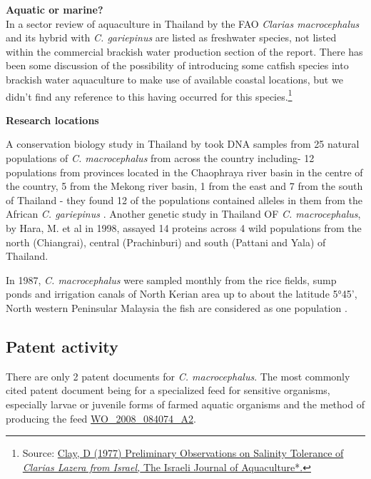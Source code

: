 \documentclass[]{book}
\theoremstyle{definition}
\theoremstyle{definition}
\theoremstyle{definition}
\theoremstyle{remark}
\begin{document}
\textbf{Aquatic or marine?}\\
In a sector review of aquaculture in Thailand by the FAO \emph{Clarias
macrocephalus} and its hybrid with \emph{C. gariepinus} are listed as
freshwater species, not listed within the commercial brackish water
production section of the report. There has been some discussion of the
possibility of introducing some catfish species into brackish water
aquaculture to make use of available coastal locations, but we didn't
find any reference to this having occurred for this species.\footnote{Source:
  \href{https://www.researchgate.net/profile/Douglas_Clay/publication/313167412_Preliminary_observations_on_salinity_tolerance_of_Clarias_lazera_from_Israel/links/58d73761aca2727e5ee94ab6/Preliminary-observations-on-salinity-tolerance-of-Clarias-lazera-from-Israel.pdf}{Clay,
  D (1977) Preliminary Observations on Salinity Tolerance of
  \emph{Clarias Lazera from Israel, }The Israeli Journal of
  Aquaculture*.}}

\textbf{Research locations}

A conservation biology study in Thailand by \citet{Na_Nakorn_2004} took
DNA samples from 25 natural populations of \emph{C. macrocephalus} from
across the country including- 12 populations from provinces located in
the Chaophraya river basin in the centre of the country, 5 from the
Mekong river basin, 1 from the east and 7 from the south of Thailand -
they found 12 of the populations contained alleles in them from the
African \emph{C. gariepinus} \citep{Na_Nakorn_2004}. Another genetic
study in Thailand OF \emph{C. macrocephalus}, by Hara, M. et al in 1998,
assayed 14 proteins across 4 wild populations from the north
(Chiangrai), central (Prachinburi) and south (Pattani and Yala) of
Thailand.

In 1987, \emph{C. macrocephalus} were sampled monthly from the rice
fields, sump ponds and irrigation canals of North Kerian area up to
about the latitude 5°45', North western Peninsular Malaysia the fish are
considered as one population \citep{Ali_1993}.

\hypertarget{patent-activity}{%
\subsection{Patent activity}\label{patent-activity}}

There are only 2 patent documents for \emph{C. macrocephalus}. The most
commonly cited patent document being for a specialized feed for
sensitive organisms, especially larvae or juvenile forms of farmed
aquatic organisms and the method of producing the feed
\href{https://www.lens.org/lens/patent/WO_2008_084074_A2}{WO\_2008\_084074\_A2}.
\end{document}
